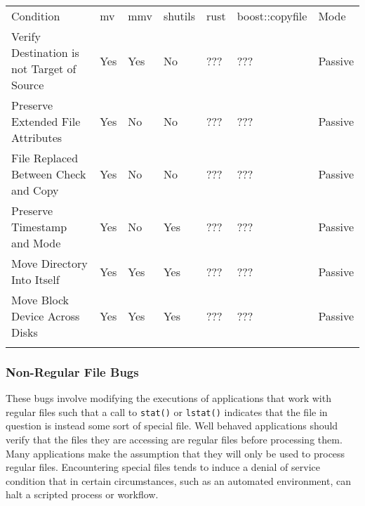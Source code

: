             \begin{table}[t]
                \scriptsize{}
                \begin{tabular}{l l l l l l | l}
                \toprule{}
                  Condition & mv & mmv & shutils & rust & boost::copyfile & Mode\\
                  Verify Destination is not Target of Source & Yes & Yes & No & ??? & ??? & Passive\\
                  Preserve Extended File Attributes & Yes & No & No & ??? & ??? & Passive\\
                  File Replaced Between Check and Copy & Yes & No & No & ??? & ??? & Passive\\
                  Preserve Timestamp and Mode & Yes & No & Yes & ??? & ??? & Passive\\
                  Move Directory Into Itself & Yes & Yes & Yes & ??? & ??? & Passive\\
                  Move Block Device Across Disks & Yes & Yes & Yes & ??? & ??? & Passive\\
                \bottomrule{}
                \end{tabular}
            \end{table}

        \subsubsection{Non-Regular File Bugs}

        These bugs involve modifying the executions of applications that work with regular files such that a call to
        {\tt stat()} or {\tt lstat()} indicates that the file in question is instead some sort of special file.  Well behaved
        applications should verify that the files they are accessing are regular files before processing them.  Many
        applications make the assumption that they will only be used to process regular files.  Encountering special
        files tends to induce a denial of service condition that in certain circumstances, such as an automated
        environment, can halt a scripted process or workflow.

